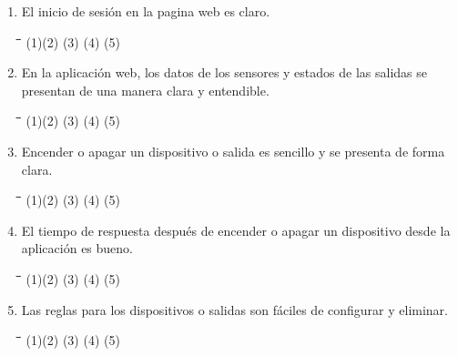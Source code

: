 \begin{appendix}
\begin{enumerate}
	\item El inicio de sesión en la pagina web es claro.
	
\begin{tabbing}
	\hspace{2cm}\=\hspace{2cm}\=\hspace{2cm}\=\hspace{2cm}\=\kill
	(1)\>(2)  \>(3)  \>(4)  \>(5) 
\end{tabbing} 

	\item En la aplicación web, los datos de los sensores y estados de las salidas se presentan de una manera clara y entendible.

\begin{tabbing}
	\hspace{2cm}\=\hspace{2cm}\=\hspace{2cm}\=\hspace{2cm}\=\kill
	(1)\>(2)  \>(3)  \>(4)  \>(5) 
\end{tabbing} 
	
	\item Encender o apagar un dispositivo o salida es sencillo y se presenta de forma clara.
	
\begin{tabbing}
	\hspace{2cm}\=\hspace{2cm}\=\hspace{2cm}\=\hspace{2cm}\=\kill
	(1)\>(2)  \>(3)  \>(4)  \>(5) 
\end{tabbing} 

	\item El tiempo de respuesta después de encender o apagar un dispositivo desde la aplicación es bueno.

	\begin{tabbing}
		\hspace{2cm}\=\hspace{2cm}\=\hspace{2cm}\=\hspace{2cm}\=\kill
		(1)\>(2)  \>(3)  \>(4)  \>(5) 
	\end{tabbing} 

	\item Las reglas para los dispositivos o salidas son fáciles de configurar y eliminar.

\begin{tabbing}
	\hspace{2cm}\=\hspace{2cm}\=\hspace{2cm}\=\hspace{2cm}\=\kill
	(1)\>(2)  \>(3)  \>(4)  \>(5) 
\end{tabbing} 


\end{enumerate}
\end{appendix}

